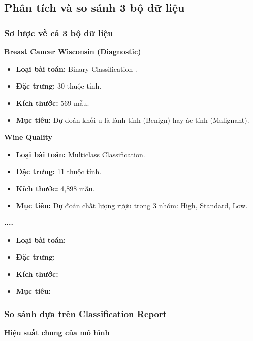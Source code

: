 \subsection{Phân tích và so sánh 3 bộ dữ liệu}


\subsubsection{Sơ lược về cả 3 bộ dữ liệu}
\textbf{Breast Cancer Wisconsin (Diagnostic)}  
\begin{itemize}
	\item \textbf{Loại bài toán:} Binary Classification .  
	\item \textbf{Đặc trưng:} 30 thuộc tính.  
	\item \textbf{Kích thước:} 569 mẫu.  
	\item \textbf{Mục tiêu:} Dự đoán khối u là lành tính (Benign) hay ác tính (Malignant).
\end{itemize}

\vspace{0.3cm}

\textbf{Wine Quality}  
\begin{itemize}
	\item \textbf{Loại bài toán:} Multiclass Classification.  
	\item \textbf{Đặc trưng:} 11 thuộc tính.  
	\item \textbf{Kích thước:} 4,898 mẫu.  
	\item \textbf{Mục tiêu:} Dự đoán chất lượng rượu trong 3 nhóm: High, Standard, Low.
\end{itemize}

\vspace{0.3cm}

\textbf{....}  
\begin{itemize}
	\item \textbf{Loại bài toán:} 
	\item \textbf{Đặc trưng:} 
	\item \textbf{Kích thước:} 
	\item \textbf{Mục tiêu:} 
\end{itemize}

\subsubsection{So sánh dựa trên Classification Report}

\textbf{Hiệu suất chung của mô hình}

